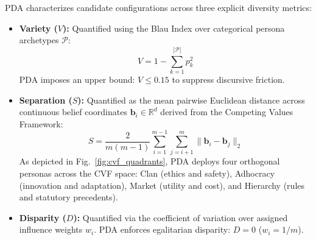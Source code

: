 \documentclass[conference]{IEEEtran}
\begin{document}
PDA characterizes candidate configurations across three explicit diversity metrics:
\begin{itemize}
    \item \textbf{Variety ($V$):} Quantified using the Blau Index over categorical persona archetypes $\mathcal{P}$:
    \begin{equation}
    V = 1 - \sum_{k=1}^{|\mathcal{P}|} p_k^2
    \end{equation}
    PDA imposes an upper bound: $V \le 0.15$ to suppress discursive friction.
    \item \textbf{Separation ($S$):} Quantified as the mean pairwise Euclidean distance across continuous belief coordinates $\mathbf{b}_i \in \mathbb{R}^d$ derived from the Competing Values Framework:
    \begin{equation}
    S = \frac{2}{m(m-1)} \sum_{i=1}^{m-1} \sum_{j=i+1}^m \|\mathbf{b}_i - \mathbf{b}_j\|_2
    \end{equation}
    As depicted in Fig.~\ref{fig:cvf_quadrants}, PDA deploys four orthogonal personas across the CVF space: Clan (ethics and safety), Adhocracy (innovation and adaptation), Market (utility and cost), and Hierarchy (rules and statutory precedents).
    \item \textbf{Disparity ($D$):} Quantified via the coefficient of variation over assigned influence weights $w_i$. PDA enforces egalitarian disparity: $D = 0$ ($w_i = 1/m$).
\end{itemize}
\end{document}
